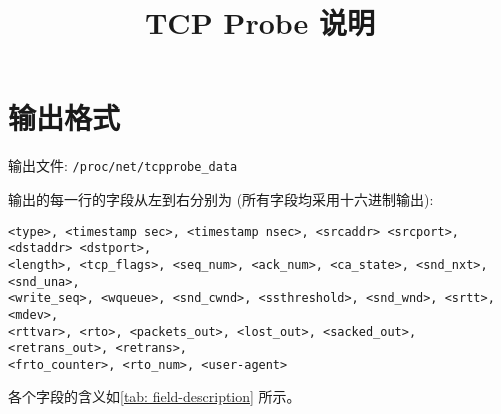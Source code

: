 \documentclass{article}
\begin{document}
	\title{TCP Probe 说明}
	\date{}
	\maketitle
	\section{输出格式}
	\par 输出文件: \texttt{/proc/net/tcpprobe\_data}
	\par 输出的每一行的字段从左到右分别为 (所有字段均采用十六进制输出):
	\begin{Verbatim}[frame=single]
<type>, <timestamp sec>, <timestamp nsec>, <srcaddr> <srcport>, <dstaddr> <dstport>,
<length>, <tcp_flags>, <seq_num>, <ack_num>, <ca_state>, <snd_nxt>, <snd_una>,
<write_seq>, <wqueue>, <snd_cwnd>, <ssthreshold>, <snd_wnd>, <srtt>, <mdev>,
<rttvar>, <rto>, <packets_out>, <lost_out>, <sacked_out>, <retrans_out>, <retrans>,
<frto_counter>, <rto_num>, <user-agent>
	\end{Verbatim}
	\par 各个字段的含义如\tablename{\ref{tab: field-description}} 所示。
\end{document}
